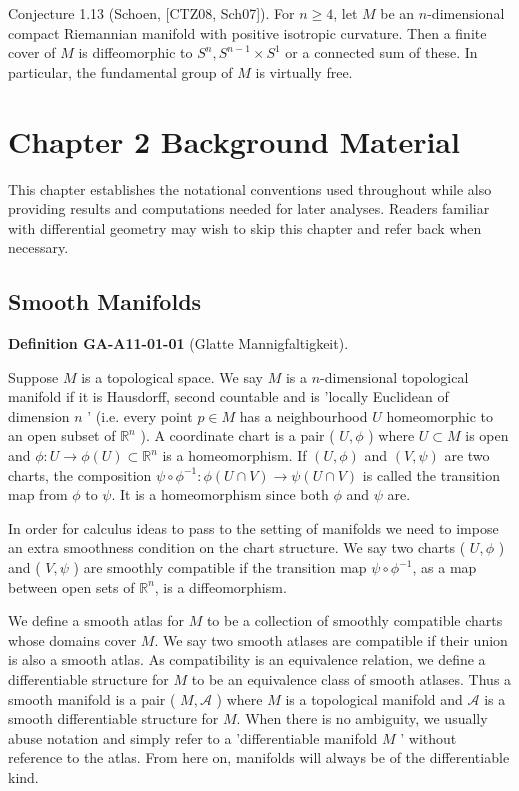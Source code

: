 \documentclass[10pt, letterpaper]{article}
\newcommand{\CustomHeading}[3]{%
  \par\medskip\noindent%
  \textbf{#1 #2} \textnormal{(#3)}.\enskip%
}
\newenvironment{DEF}[2]{\begin{unitbox}\CustomHeading{Definition}{#1}{#2}}{\end{unitbox}}
\begin{document}
Conjecture 1.13 (Schoen, [CTZ08, Sch07]). For $n \geq 4$, let $M$ be an $n$-dimensional compact Riemannian manifold with positive isotropic curvature. Then a finite cover of $M$ is diffeomorphic to $S^{n}, S^{n-1} \times S^{1}$ or a connected sum of these. In particular, the fundamental group of $M$ is virtually free.




\pagebreak


\section{Chapter 2 Background Material}
This chapter establishes the notational conventions used throughout while also providing results and computations needed for later analyses. Readers familiar with differential geometry may wish to skip this chapter and refer back when necessary.

\subsection*{Smooth Manifolds}

\begin{DEF}{GA-A11-01-01}{Glatte Mannigfaltigkeit}
Suppose $M$ is a topological space. We say $M$ is a $n$-dimensional topological manifold if it is Hausdorff, second countable and is 'locally Euclidean of dimension $n$ ' (i.e. every point $p \in M$ has a neighbourhood $U$ homeomorphic to an open subset of $\mathbb{R}^{n}$ ). A coordinate chart is a pair ( $U, \phi$ ) where $U \subset M$ is open and $\phi: U \rightarrow \phi(U) \subset \mathbb{R}^{n}$ is a homeomorphism. If $(U, \phi)$ and $(V, \psi)$ are two charts, the composition $\psi \circ \phi^{-1}: \phi(U \cap V) \rightarrow \psi(U \cap V)$ is called the transition map from $\phi$ to $\psi$. It is a homeomorphism since both $\phi$ and $\psi$ are.

In order for calculus ideas to pass to the setting of manifolds we need to impose an extra smoothness condition on the chart structure. We say two charts ( $U, \phi$ ) and ( $V, \psi$ ) are smoothly compatible if the transition map $\psi \circ \phi^{-1}$, as a map between open sets of $\mathbb{R}^{n}$, is a diffeomorphism.

We define a smooth atlas for $M$ to be a collection of smoothly compatible charts whose domains cover $M$. We say two smooth atlases are compatible if their union is also a smooth atlas. As compatibility is an equivalence relation, we define a differentiable structure for $M$ to be an equivalence class of smooth atlases. Thus a smooth manifold is a pair ( $M, \mathscr{A}$ ) where $M$ is a topological manifold and $\mathscr{A}$ is a smooth differentiable structure for $M$. When there is no ambiguity, we usually abuse notation and simply refer to a 'differentiable manifold $M$ ' without reference to the atlas. From here on, manifolds will always be of the differentiable kind.
\end{DEF}
\end{document}

